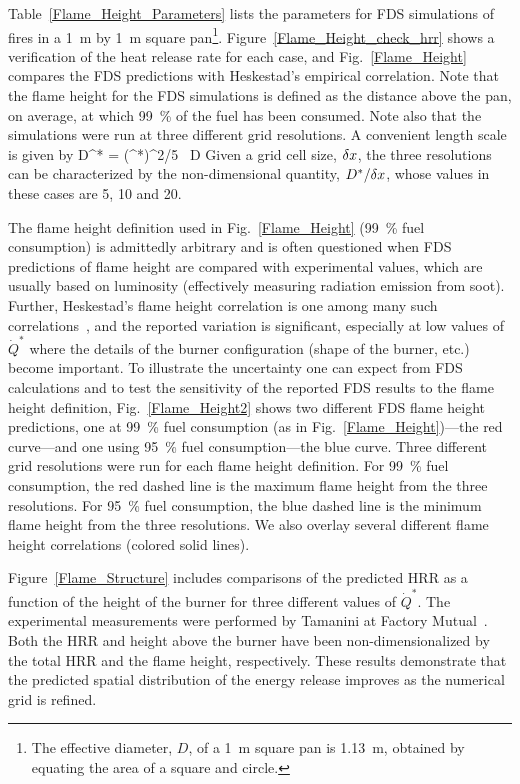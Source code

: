 Table~\ref{Flame_Height_Parameters} lists the parameters for FDS simulations of fires in a 1~m by 1~m square pan\footnote{The effective diameter, $D$, of a 1~m square pan is 1.13~m, obtained by equating the area of a square and circle.}. Figure~\ref{Flame_Height_check_hrr} shows a verification of the heat release rate for each case, and Fig.~\ref{Flame_Height} compares the FDS predictions with Heskestad's empirical correlation. Note that the flame height for the FDS simulations is defined as the distance above the pan, on average, at which 99~\% of the fuel has been consumed. Note also that the simulations were run at three different grid resolutions. A convenient length scale is given by
\be
   D^* = (^*)^{2/5} \, D
\ee
Given a grid cell size, $\delta x$, the three resolutions can be characterized by the non-dimensional quantity, $D^*/\delta x$, whose values in these cases are 5, 10 and 20.

The flame height definition used in Fig.~\ref{Flame_Height} (99~\% fuel consumption) is admittedly arbitrary and is often questioned when FDS predictions of flame height are compared with experimental values, which are usually based on luminosity (effectively measuring radiation emission from soot).  Further, Heskestad's flame height correlation is one among many such correlations~\cite{SFPE:Heskestad,Steward:1970,Becker:1978,Cox:1985,Hasemi:1984,Cetegen:1984,Delichatsios:1984}, and the reported variation is significant, especially at low values of $\dot{Q}^*$ where the details of the burner configuration (shape of the burner, etc.) become important.  To illustrate the uncertainty one can expect from FDS calculations and to test the sensitivity of the reported FDS results to the flame height definition, Fig.~\ref{Flame_Height2} shows two different FDS flame height predictions, one at 99~\% fuel consumption (as in Fig.~\ref{Flame_Height})---the red curve---and one using 95~\% fuel consumption---the blue curve.  Three different grid resolutions were run for each flame height definition.  For 99~\% fuel consumption, the red dashed line is the maximum flame height from the three resolutions.  For 95~\% fuel consumption, the blue dashed line is the minimum flame height from the three resolutions.  We also overlay several different flame height correlations (colored solid lines).

Figure~\ref{Flame_Structure} includes comparisons of the predicted HRR as a function of the height of the burner for three different values of $\dot{Q}^*$. The experimental measurements were performed by Tamanini at Factory Mutual~\cite{Tamanini:CF1983}. Both the HRR and height above the burner have been non-dimensionalized by the total HRR and the flame height, respectively. These results demonstrate that the predicted spatial distribution of the energy release improves as the numerical grid is refined.

